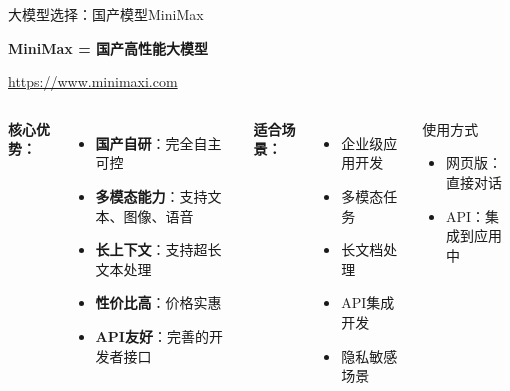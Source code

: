 \begin{frame}{大模型选择：国产模型MiniMax}
	\begin{center}
		\Huge \textbf{MiniMax = 国产高性能大模型}

		\vspace{0.5cm}

		\normalsize
		\textcolor{blue}{\url{https://www.minimaxi.com}}
	\end{center}

	\vspace{0.3cm}

	\begin{columns}
		\textbf{核心优势：}
		\begin{itemize}
			\item \textbf{国产自研}：完全自主可控
			\item \textbf{多模态能力}：支持文本、图像、语音
			\item \textbf{长上下文}：支持超长文本处理
			\item \textbf{性价比高}：价格实惠
			\item \textbf{API友好}：完善的开发者接口
		\end{itemize}

		\textbf{适合场景：}
		\begin{itemize}
			\item 企业级应用开发
			\item 多模态任务
			\item 长文档处理
			\item API集成开发
			\item 隐私敏感场景
		\end{itemize}

		\vspace{0.3cm}

		\begin{block}{使用方式}
			\begin{itemize}
				\item 网页版：直接对话
				\item API：集成到应用中
			\end{itemize}
		\end{block}
	\end{columns}
\end{frame}


